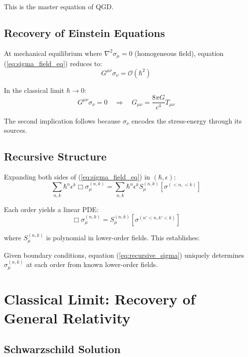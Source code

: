 \documentclass[11pt,a4paper]{article}
\theoremstyle{definition}
\theoremstyle{remark}
\begin{document}
	This is the master equation of QGD.
	
	\subsection{Recovery of Einstein Equations}
	
	At mechanical equilibrium where $\nabla^2\sigma_\mu = 0$ (homogeneous field), equation (\ref{eq:sigma_field_eq}) reduces to:
	\begin{equation}
		G^{\mu\nu}\sigma_\nu = \mathcal{O}(\hbar^2)
	\end{equation}
	
	In the classical limit $\hbar \to 0$:
	\begin{equation}\label{eq:einstein_recovery}
		\boxed{G^{\mu\nu}\sigma_\nu = 0 \quad \Rightarrow \quad G_{\mu\nu} = \frac{8\pi G}{c^4}T_{\mu\nu}}
	\end{equation}
	
	The second implication follows because $\sigma_\nu$ encodes the stress-energy through its sources.
	
	\subsection{Recursive Structure}
	
	Expanding both sides of (\ref{eq:sigma_field_eq}) in $(\hbar, \epsilon)$:
	\begin{equation}
		\sum_{n,k}\hbar^n\epsilon^k\Box\sigma_\mu^{(n,k)} = \sum_{n,k}\hbar^n\epsilon^k S_\mu^{(n,k)}[\sigma^{(<n,<k)}]
	\end{equation}
	
	Each order yields a linear PDE:
	\begin{equation}\label{eq:recursive_sigma}
		\boxed{\Box\sigma_\mu^{(n,k)} = S_\mu^{(n,k)}[\sigma^{(n'<n, k'<k)}]}
	\end{equation}
	
	where $S_\mu^{(n,k)}$ is polynomial in lower-order fields. This establishes:
	
		Given boundary conditions, equation (\ref{eq:recursive_sigma}) uniquely determines $\sigma_\mu^{(n,k)}$ at each order from known lower-order fields.
	
	\section{Classical Limit: Recovery of General Relativity}
	
	\subsection{Schwarzschild Solution}
	
\end{document}
